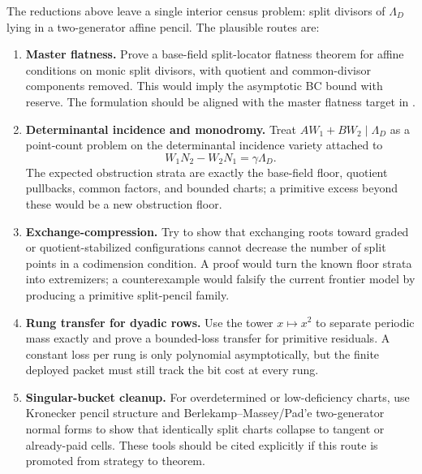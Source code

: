 \begin{remark}
\label{rem:gf-bc-routes}
The reductions above leave a single interior census problem: split divisors of
\(\Lambda_D\) lying in a two-generator affine pencil.  The plausible routes are:
\begin{enumerate}[label=\textup{(\alph*)}]
\item \textbf{Master flatness.}  Prove a base-field split-locator flatness
theorem for affine conditions on monic split divisors, with quotient and
common-divisor components removed.  This would imply the asymptotic BC bound
with reserve.  The formulation should be aligned with the master flatness
target in \cite{CAP25v13}.
\item \textbf{Determinantal incidence and monodromy.}  Treat
\(AW_1+BW_2\mid\Lambda_D\) as a point-count problem on the determinantal
incidence variety attached to
\[
        W_1N_2-W_2N_1=\gamma\Lambda_D .
\]
The expected obstruction strata are exactly the base-field floor, quotient
pullbacks, common factors, and bounded charts; a primitive excess beyond these
would be a new obstruction floor.
\item \textbf{Exchange-compression.}  Try to show that exchanging roots toward
graded or quotient-stabilized configurations cannot decrease the number of
split points in a codimension condition.  A proof would turn the known floor
strata into extremizers; a counterexample would falsify the current frontier
model by producing a primitive split-pencil family.
\item \textbf{Rung transfer for dyadic rows.}  Use the tower
\(x\mapsto x^2\) to separate periodic mass exactly and prove a bounded-loss
transfer for primitive residuals.  A constant loss per rung is only polynomial
asymptotically, but the finite deployed packet must still track the bit cost
at every rung.
\item \textbf{Singular-bucket cleanup.}  For overdetermined or low-deficiency
charts, use Kronecker pencil structure and Berlekamp--Massey/Pad'e
two-generator normal forms to show that identically split charts collapse to
tangent or already-paid cells.  These tools should be cited explicitly if this
route is promoted from strategy to theorem.
\end{enumerate}
\end{remark}

